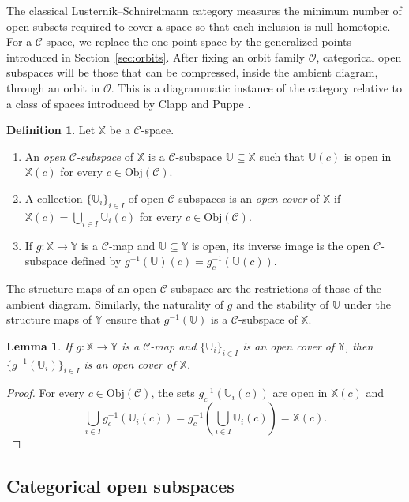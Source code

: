 \documentclass[12pt]{amsart}
\newtheorem{lemma}[teo]{Lemma}
\theoremstyle{definition}
\newtheorem{defi}[teo]{Definition}
\theoremstyle{remark}
\numberwithin{figure}{section}%
\newcommand{\CC}{\mathcal{C}}
\newcommand{\X}{\mathbb{X}}
\newcommand{\Y}{\mathbb{Y}}
\newcommand{\Obj}{\mathrm{Obj}}
\newcommand{\Uu}{\mathbb{U}}
\begin{document}
The classical Lusternik--Schnirelmann category measures the minimum
number of open subsets required to cover a space so that each inclusion
is null-homotopic. For a $\CC$-space, we replace the one-point space by
the generalized points introduced in Section~\ref{sec:orbits}. After
fixing an orbit family $\mathcal O$, categorical open subspaces will be
those that can be compressed, inside the ambient diagram, through an
orbit in $\mathcal O$. This is a diagrammatic instance of the category
relative to a class of spaces introduced by Clapp and Puppe
\cite{ClappPuppe1986}.

\begin{defi}\label{def:open-C-subspaces}
Let $\X$ be a $\CC$-space.
\begin{enumerate}
    \item An \emph{open $\CC$-subspace} of $\X$ is a $\CC$-subspace
    $\Uu\subseteq\X$ such that $\Uu(c)$ is open in $\X(c)$ for every
    $c\in\Obj(\CC)$.

    \item A collection $\{\Uu_i\}_{i\in I}$ of open $\CC$-subspaces is
    an \emph{open cover} of $\X$ if
    $\X(c)=\bigcup_{i\in I}\Uu_i(c)$ for every $c\in\Obj(\CC)$.

    \item If $g\colon\X\to\Y$ is a $\CC$-map and
    $\Uu\subseteq\Y$ is open, its inverse image is the open
    $\CC$-subspace defined by
    $g^{-1}(\Uu)(c)=g_c^{-1}(\Uu(c))$.
\end{enumerate}
\end{defi}

The structure maps of an open $\CC$-subspace are the restrictions of
those of the ambient diagram. Similarly, the naturality of $g$ and the
stability of $\Uu$ under the structure maps of $\Y$ ensure that
$g^{-1}(\Uu)$ is a $\CC$-subspace of $\X$.

\begin{lemma}\label{lem:inverse_image_covers}
If $g\colon\X\to\Y$ is a $\CC$-map and
$\{\Uu_i\}_{i\in I}$ is an open cover of $\Y$, then
$\{g^{-1}(\Uu_i)\}_{i\in I}$ is an open cover of $\X$.
\end{lemma}

\begin{proof}
For every $c\in\Obj(\CC)$, the sets
$g_c^{-1}(\Uu_i(c))$ are open in $\X(c)$ and
\[
\bigcup_{i\in I}g_c^{-1}(\Uu_i(c))
=
g_c^{-1}\left(\bigcup_{i\in I}\Uu_i(c)\right)
=
\X(c).
\]
\end{proof}

\subsection{Categorical open subspaces}
\end{document}
